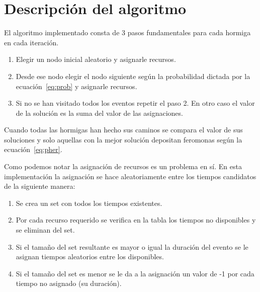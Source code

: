 \documentclass[letter, 10pt]{article}
\begin{document}
\section{Descripción del algoritmo}\label{sec:alg}

El algoritmo implementado consta de 3 pasos fundamentales para cada hormiga en
cada iteración.
\begin{enumerate}
  \item
    Elegir un nodo inicial aleatorio y asignarle recursos.
  \item
    Desde ese nodo elegir el nodo siguiente según la probabilidad dictada por la
    ecuación~\ref{eq:prob} y asignarle recursos.
  \item
    Si no se han visitado todos los eventos repetir el paso 2. En otro caso el
    valor de la solución es la suma del valor de las asignaciones.
\end{enumerate}

Cuando todas las hormigas han hecho sus caminos se compara el valor de sus
soluciones y solo aquellas con la mejor solución depositan feromonas según la
ecuación~\ref{eq:pher}.

Como podemos notar la asignación de recursos es un problema en sí. En esta
implementación la asignación se hace aleatoriamente entre los tiempos
candidatos de la siguiente manera:
\begin{enumerate}
  \item
    Se crea un set con todos los tiempos existentes.
  \item
    Por cada recurso requerido se verifica en la tabla los tiempos no
    disponibles y se eliminan del set.
  \item
    Si el tamaño del set resultante es mayor o igual la duración del evento se
    le asignan tiempos aleatorios entre los disponibles.
  \item
    Si el tamaño del set es menor se le da a la asignación un valor de -1 por
    cada tiempo no asignado (su duración).
\end{enumerate}
\end{document}

